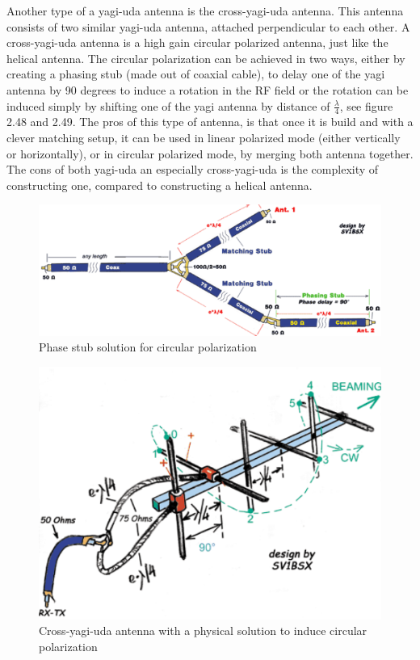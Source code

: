 Another type of a yagi-uda antenna is the cross-yagi-uda antenna. This antenna consists of two similar yagi-uda antenna, attached perpendicular to each other. A cross-yagi-uda antenna is a high gain circular polarized antenna, just like the helical antenna. The circular polarization can be achieved in two ways, either by creating a phasing stub (made out of coaxial cable), to delay one of the yagi antenna by 90 degrees to induce a rotation in the RF field or the rotation can be induced simply by shifting one of the yagi antenna by distance of $\frac{\lambda}{4}$, see figure 2.48 and 2.49. The pros of this type of antenna, is that once it is build and with a clever matching setup, it can be used in linear polarized mode (either vertically or horizontally), or in circular polarized mode, by merging both antenna together. The cons of both yagi-uda an especially cross-yagi-uda is the complexity of constructing one, compared to constructing a helical antenna. 

\begin{figure}[h]
\centering
\includegraphics[scale=0.9]{figures/PhaseStub.PNG}
\caption{Phase stub solution for circular polarization\cite{YagiMatching}}
\end{figure}

\begin{figure}[h]
\centering
\includegraphics[scale=0.9]{figures/CrossYagi.PNG}
\caption{Cross-yagi-uda antenna with a physical solution to induce circular polarization\cite{YagiMatching}}
\end{figure}

